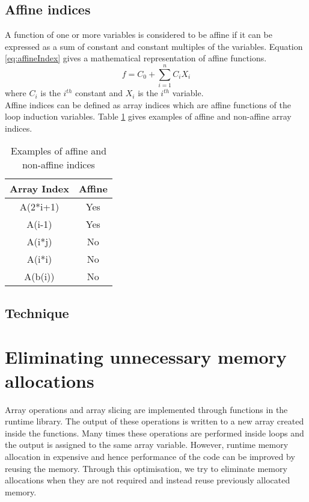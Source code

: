 \subsection{Affine indices}
A function of one or more variables is considered to be affine if it can be expressed as a sum of constant and constant multiples of the variables. Equation \ref{eq:affineIndex} gives a mathematical representation of affine functions. 
\begin{equation}
\label{eq:affineIndex}
f = C_0 + \sum\limits_{i=1}^n C_iX_i 
\end{equation}
where $C_i$ is the $i^{th}$ constant and $X_i$ is the $i^{th}$ variable.  \\
Affine indices can be defined as array indices which are affine functions of the loop induction variables. Table \ref{tab:affineIndex} gives examples of affine and non-affine array indices. 
\begin{table}[htbp]
\centering
\begin{tabular}{|c|c|}
\hline
Array Index & Affine \\ \hline
A(2*i+1)    & Yes    \\ \hline
A(i-1)    & Yes    \\ \hline
A(i*j)      & No    \\ \hline
A(i*i)      & No     \\ \hline
A(b(i))     & No     \\ \hline
\end{tabular}
\caption{Examples of affine and non-affine indices}
\label{tab:affineIndex}
\end{table}
\subsection{Technique}

\section{Eliminating unnecessary memory allocations}
\label{sec:memoptimise}
Array operations and array slicing are implemented through functions in the runtime library. The output of these operations is written to a new array created inside the functions. Many times these operations are performed inside loops and the output is assigned to the same array variable. However, runtime memory allocation in expensive and hence performance of the code can be improved by reusing the memory. Through this optimisation, we try to eliminate memory allocations when they are not required and instead reuse previously allocated memory. 

